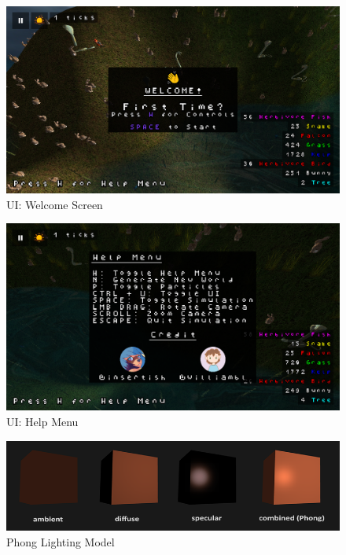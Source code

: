 \documentclass{article}
\begin{document}
    \begin{figure}
        \centering
        \includegraphics[width=\textwidth]{../screenshots/ui-welcome.png}
        \caption{UI: Welcome Screen} \label{fig:screenshot-ui-welcome}
    \end{figure}
    \begin{figure}
        \centering
        \includegraphics[width=\textwidth]{../screenshots/ui-help.png}
        \caption{UI: Help Menu} \label{fig:screenshot-ui-help}
    \end{figure}
    \begin{figure}
        \centering
        \includegraphics[width=\textwidth]{images/phong.png}
        \caption{Phong Lighting Model \cite{learnopengl-lighting}} \label{fig:phong}
    \end{figure}
\end{document}
